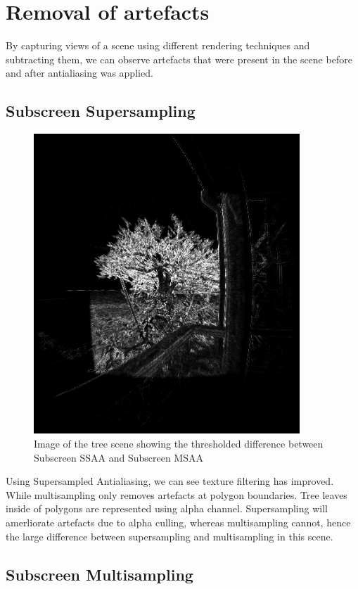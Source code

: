 \documentclass[12pt,a4paper,twoside,openright]{report}
\begin{document}
\section{Removal of artefacts}
By capturing views of a scene using different rendering techniques and subtracting them, we can observe artefacts that were present in the scene before and after antialiasing was applied.

\subsection{Subscreen Supersampling}

\begin{figure}[tbh]
\centerline{\includegraphics[width=10cm]{figs/difftree.png}}
\caption{Image of the tree scene showing the thresholded difference between Subscreen SSAA and Subscreen MSAA}
\label{ssaatree}
\end{figure}

Using Supersampled Antialiasing, we can see texture filtering has improved. While multisampling only removes artefacts at polygon boundaries. Tree leaves inside of polygons are represented using alpha channel. Supersampling will amerliorate artefacts due to alpha culling, whereas multisampling cannot, hence the large difference between supersampling and multisampling in this scene.

\subsection{Subscreen Multisampling}
\end{document}
